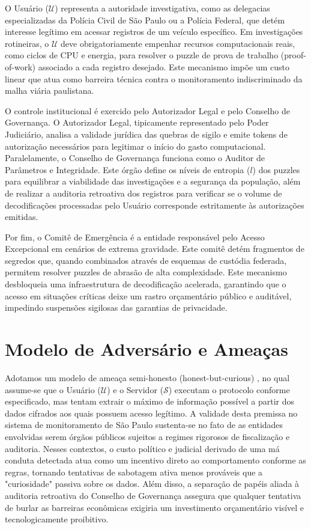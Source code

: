 O Usuário ($\mathcal{U}$) representa a autoridade investigativa, como as delegacias especializadas da Polícia Civil de São Paulo ou a Polícia Federal, que detém interesse legítimo em acessar registros de um veículo específico. Em investigações rotineiras, o $\mathcal{U}$ deve obrigatoriamente empenhar recursos computacionais reais, como ciclos de CPU e energia, para resolver o puzzle de prova de trabalho (proof-of-work) associado a cada registro desejado. Este mecanismo impõe um custo linear que atua como barreira técnica contra o monitoramento indiscriminado da malha viária paulistana.

O controle institucional é exercido pelo Autorizador Legal e pelo Conselho de Governança. O Autorizador Legal, tipicamente representado pelo Poder Judiciário, analisa a validade jurídica das quebras de sigilo e emite tokens de autorização necessários para legitimar o início do gasto computacional. Paralelamente, o Conselho de Governança funciona como o Auditor de Parâmetros e Integridade. Este órgão define os níveis de entropia ($l$) dos puzzles para equilibrar a viabilidade das investigações e a segurança da população, além de realizar a auditoria retroativa dos registros para verificar se o volume de decodificações processadas pelo Usuário corresponde estritamente às autorizações emitidas.

Por fim, o Comitê de Emergência é a entidade responsável pelo Acesso Excepcional em cenários de extrema gravidade. Este comitê detém fragmentos de segredos que, quando combinados através de esquemas de custódia federada, permitem resolver puzzles de abrasão de alta complexidade. Este mecanismo desbloqueia uma infraestrutura de decodificação acelerada, garantindo que o acesso em situações críticas deixe um rastro orçamentário público e auditável, impedindo suspensões sigilosas das garantias de privacidade.
    
\section{Modelo de Adversário e Ameaças}
Adotamos um modelo de ameaça semi-honesto (honest-but-curious) \cite{Link3}, no qual assume-se que o Usuário ($\mathcal{U}$) e o Servidor ($\mathcal{S}$) executam o protocolo conforme especificado, mas tentam extrair o máximo de informação possível a partir dos dados cifrados aos quais possuem acesso legítimo. A validade desta premissa no sistema de monitoramento de São Paulo sustenta-se no fato de as entidades envolvidas serem órgãos públicos sujeitos a regimes rigorosos de fiscalização e auditoria. Nesses contextos, o custo político e judicial derivado de uma má conduta detectada atua como um incentivo direto ao comportamento conforme as regras, tornando tentativas de sabotagem ativa menos prováveis que a "curiosidade" passiva sobre os dados. Além disso, a separação de papéis aliada à auditoria retroativa do Conselho de Governança assegura que qualquer tentativa de burlar as barreiras econômicas exigiria um investimento orçamentário visível e tecnologicamente proibitivo.

